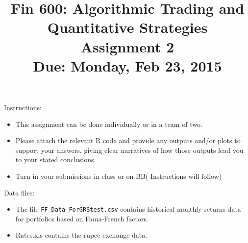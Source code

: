 \documentclass[12pt]{article}
\title{Fin 600: Algorithmic Trading and Quantitative Strategies\\\vspace{5mm}Assignment 2\\\vspace{10mm}Due: Monday, Feb 23, 2015}
\date{}
\begin{document}
\maketitle

Instructions:
\begin{itemize}
\itemsep 3mm
\item This assignment can be done individually or in a team of two.
\item Please attach the relevant R code and provide any outputs and/or plots to support your answers, giving clear narratives of how those outputs lead you to your stated conclusions.
\item Turn in your submissions in class or on BB( Instructions will follow)
\end{itemize}

\vspace{5mm}
Data files:
\begin{itemize}
\item The file {\tt FF\_Data\_ForGRStest.csv} contains historical monthly returns data for portfolios based on Fama-French factors.
\item Rates.xls contains the rupee exchange data.
\end{itemize}
\pagebreak
\end{document}
